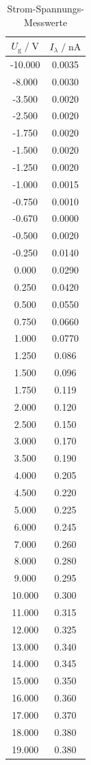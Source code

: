 \begin{table}
    \centering
    \caption{Strom-Spannungs-Messwerte}
    \label{tab:stsp}
    \begin{tabular}{c c}
    \toprule
    $ U_\text{g} \;/\; \si{\volt} $ & $I_\lambda \;/\; \si{\nano\ampere}$\\
    \midrule 
      -10.000 & 0.0035\\
       -8.000 & 0.0030\\
       -3.500 & 0.0020\\
       -2.500 & 0.0020\\
       -1.750 & 0.0020\\
       -1.500 & 0.0020\\
       -1.250 & 0.0020\\
       -1.000 & 0.0015\\
       -0.750 & 0.0010\\
       -0.670 & 0.0000\\ 
       -0.500 & 0.0020\\
       -0.250 & 0.0140\\
        0.000 & 0.0290\\
        0.250 & 0.0420\\
        0.500 & 0.0550\\
        0.750 & 0.0660\\
        1.000 & 0.0770\\
        1.250 & 0.086\\
        1.500 & 0.096\\
        1.750 & 0.119\\
        2.000 & 0.120\\
        2.500 & 0.150\\
        3.000 & 0.170\\
        3.500 & 0.190\\
        4.000 & 0.205\\
        4.500 & 0.220\\
        5.000 & 0.225\\
        6.000 & 0.245\\
        7.000 & 0.260\\
        8.000 & 0.280\\
        9.000 & 0.295\\
       10.000 & 0.300\\
       11.000 & 0.315\\
       12.000 & 0.325\\
       13.000 & 0.340\\
       14.000 & 0.345\\
       15.000 & 0.350\\
       16.000 & 0.360\\
       17.000 & 0.370\\
       18.000 & 0.380\\
       19.000 & 0.380\\
       \bottomrule
    \end{tabular}
\end{table}

